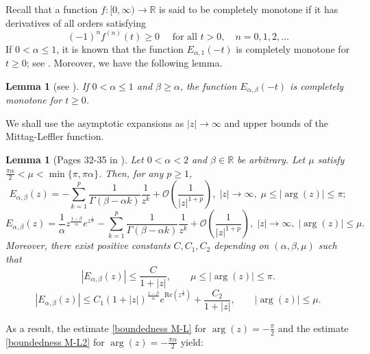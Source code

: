 \documentclass[reqno]{amsart}
\newtheorem{lem}[theorem]{Lemma}
\numberwithin{equation}{section}
\begin{document}
Recall that a function $f:[0, \infty) \rightarrow \mathbb{R}$ is said to be completely monotone if it has derivatives of all orders satisfying
$$
(-1)^n f^{(n)}(t) \geq 0 \quad \text { for all } t>0,\quad n=0,1,2, \ldots
$$
If $0 <\alpha \le 1$, it is known that the function $E_{\alpha,1}(-t)$ is completely monotone for $t\ge 0$; see \cite{Po48}. Moreover, we have the following lemma. %
\begin{lem}[see \cite{Sc96}]\label{lmcm}
If $0 <\alpha \le 1$ and $\beta \ge \alpha$, the function $E_{\alpha, \beta}(-t)$ is completely monotone for $t\ge 0$.
\end{lem}

We shall use the asymptotic expansions as $|z|\to \infty$ and upper bounds of the Mittag-Leffler function.
\begin{lem}[Pages 32-35 in \cite{podlubny99}]
Let $0<\alpha<2$ and $\beta \in \mathbb{R}$ be arbitrary. Let $\mu$ satisfy $\frac{\pi \alpha}{2}<\mu<\min \{\pi, \pi \alpha\}$. Then, for any $p\ge 1$,
\begin{equation}\label{asymptotic expansions}
    E_{\alpha, \beta}(z)=-\sum_{k=1}^p\frac{1}{\Gamma(\beta-\alpha k)}\frac{1}{z^k} + \mathcal{O}\left(\frac{1}{|z|^{1+p}} \right), \; |z|\to \infty, \; \mu \leq |\arg (z)| \leq \pi;
\end{equation}
\begin{equation}\label{asymptotic expansions2}
    E_{\alpha, \beta}(z)=\frac{1}{\alpha} z^{\frac{1-\beta}{\alpha}} e^{z^{\frac{1}{\alpha}}}-\sum_{k=1}^p\frac{1}{\Gamma(\beta-\alpha k)}\frac{1}{z^k} + \mathcal{O}\left(\frac{1}{|z|^{1+p}} \right), \; |z|\to \infty, \; |\arg (z)|\leq \mu.
\end{equation}
Moreover, there exist positive constants $C,C_1,C_2$ depending on $(\alpha, \beta, \mu)$ such that
\begin{equation}\label{boundedness M-L}
\left|E_{\alpha, \beta}(z)\right| \leq \frac{C}{1+|z|}, \qquad \mu \leq |\arg (z)| \leq \pi.
\end{equation}
\begin{equation}\label{boundedness M-L2}
\left|E_{\alpha, \beta}(z)\right| \leq C_1 (1+|z|)^{\frac{1-\beta}{\alpha}} e^{\mathrm{Re}(z^{\frac{1}{\alpha}})}+ \frac{C_2}{1+|z|}, \qquad |\arg (z)| \leq \mu.
\end{equation}
\end{lem}
As a result, the estimate \eqref{boundedness M-L} for $\arg (z)=-\frac{\pi}{2}$ and the estimate \eqref{boundedness M-L2} for $\arg (z)=-\frac{\pi \alpha}{2}$ yield:
\end{document}
